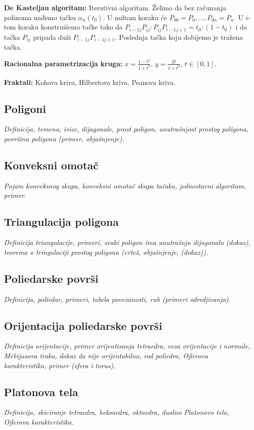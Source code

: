 \documentclass[12pt]{article}
\begin{document}
\textbf{De Kasteljau algoritam:} Iterativni algoritam. Želimo da bez računanja
polinoma nađemo tačku $\alpha_n(t_0)$. U nultom koraku će
$P_{00}=P_0,\dotsc,P_{0n}=P_n$. U $i$-tom koraku konstruišemo tačke tako da
$P_{i-1j}P_{ij}:P_{ij}P_{i-1j+1}=t_0:(1-t_0)$ i da tačka $P_{ij}$ pripada duži
$P_{i-1j}P_{i-1j+1}$. Poslednja tačka koju dobijemo je tražena tačka.
\par

\textbf{Racionalna parametrizacija kruga:} $x=\frac{1-t^2}{1+t^2}$,
$y=\frac{2t}{1+t^2}$, $t\in[0,1]$.
\par

\textbf{Fraktali:} Kohova kriva, Hilbertova kriva, Peanova kriva.

\subsection{Poligoni}
\textit{Definicija, temena, ivice, dijagonale, prost poligon, unutrašnjost
    prostog poligona, površina poligona (primer, objašnjenje).}
\par
\vspace*{1cm}

\subsection{Konveksni omotač}
\textit{Pojam konveksnog skupa, konveksni omotač skupa tačaka, jednostavni
    algoritam, primer.}
\par
\vspace*{1cm}

\subsection{Triangulacija poligona}
\textit{Definicija triangulacije, primeri, svaki poligon ima unutrašnju
    dijagonalu (dokaz), teorema o tringulaciji prostog poligona (crtež,
    objašnjenje, (dokaz)).}
\par
\vspace*{1cm}

\subsection{Poliedarske površi}
\textit{Definicija, poliedar, primeri, tabela povezanosti, rub (primeri
    odredjivanja).}
\par
\vspace*{1cm}

\subsection{Orijentacija poliedarske površi}
\textit{Definicija orijentacije, primer orijentisanja tetraedra, veza
    orijentacije i normale, Mebijusova traka, dokaz da nije orijentabilna, rod
    poliedra, Ojlerova karakteristika, primer (sfera i torus).}
\par
\vspace*{1cm}

\subsection{Platonova tela}
\textit{Definicija, skiciranje tetraedra, heksaedra, oktaedra, dualno Platonovo
    telo, Ojlerova karakteristika.}
\end{document}
